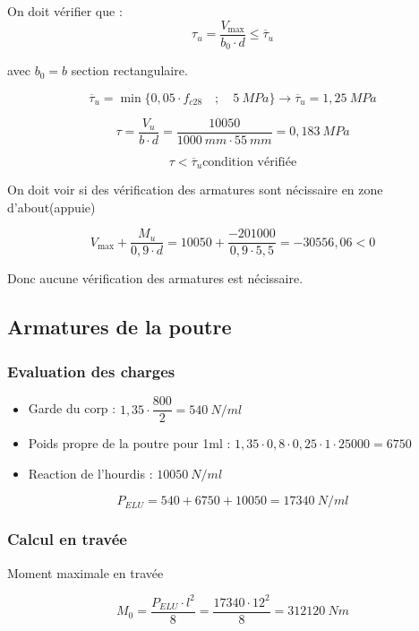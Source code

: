 \documentclass[12pt,a4paper]{article}
\begin{document}
	On doit vérifier que : \[ \tau_{u} = \dfrac{V_{\max}}{b_{0} \cdot d} \leq \overline{\tau}_{u} \]
	
	avec $ b_{0} = b $ section rectangulaire.
	
	\[ \overline{\tau}_{u}  =  \min \bigg\{ 0,05 \cdot f_{c28} \quad;\quad 5 ~\unit{MPa} \bigg\} \rightarrow \overline{\tau}_{u}  = 1,25 ~\unit{MPa} \]
	
	\[ \tau = \dfrac{V_{u}}{b \cdot d} = \dfrac{10050}{1000 ~\unit{mm} \cdot 55 ~\unit{mm}}  = 0,183 ~\unit{MPa} \]
	
	\[ \tau < \overline{\tau}_{u} \text{condition vérifiée} \]
	
	On doit voir si des vérification des armatures sont nécissaire en zone d'about(appuie)
	
	\[ V_{\max} + \dfrac{M_{u}}{0,9 \cdot d} = 10050 + \dfrac{ - 201000}{0,9 \cdot 5,5} =  - 30556,06 < 0 \]
	
	Donc aucune vérification des armatures est nécissaire.
	
	
	
	\subsection{Armatures de la poutre}
	
	\subsubsection{Evaluation des charges}
	
	\begin{itemize}
		\item Garde du corp : $ 1,35 \cdot \dfrac{800}{2}  = 540 ~\unit{N\per ml} $
		\item Poids propre de la poutre pour 1ml : $ 1,35 \cdot 0,8 \cdot 0,25 \cdot 1 \cdot 25000  = 6750 $
		\item Reaction de l'hourdis : $ 10050 ~\unit{N \per ml} $
	\end{itemize}
	
	\[ P_{ELU}  = 540  + 6750 + 10050  = 17340 ~\unit{N\per ml} \]
	
	
	\subsubsection{Calcul en travée}
	
	Moment maximale en travée
	
	\[ M_{0} = \dfrac{P_{ELU} \cdot l^{2}}{8}  = \dfrac{17340 \cdot 12^{2}}{8} = 312120 ~\unit{Nm} \]
	
\end{document}
